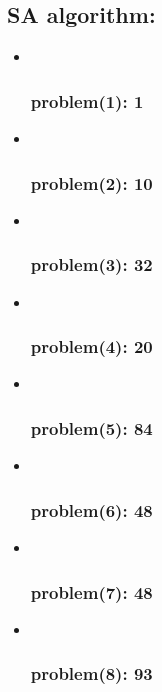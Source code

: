 \documentclass[11pt]{article}
\begin{document}
\hypertarget{sa-algorithm}{%
\subsection{\texorpdfstring{ SA
algorithm:}{  SA algorithm:}}\label{sa-algorithm}}

\begin{itemize}
\item ~
  \hypertarget{problem1-1}{%
  \subsubsection{\texorpdfstring{ problem(1):
  1}{  problem(1): 1}}\label{problem1-1}}
\item ~
  \hypertarget{problem2-10}{%
  \subsubsection{\texorpdfstring{ problem(2):
  10}{  problem(2): 10}}\label{problem2-10}}
\item ~
  \hypertarget{problem3-32}{%
  \subsubsection{\texorpdfstring{ problem(3):
  32}{  problem(3): 32}}\label{problem3-32}}
\item ~
  \hypertarget{problem4-20}{%
  \subsubsection{\texorpdfstring{ problem(4):
  20}{  problem(4): 20}}\label{problem4-20}}
\item ~
  \hypertarget{problem5-84}{%
  \subsubsection{\texorpdfstring{ problem(5):
  84}{  problem(5): 84}}\label{problem5-84}}
\item ~
  \hypertarget{problem6-48}{%
  \subsubsection{\texorpdfstring{ problem(6):
  48}{  problem(6): 48}}\label{problem6-48}}
\item ~
  \hypertarget{problem7-48}{%
  \subsubsection{\texorpdfstring{ problem(7):
  48}{  problem(7): 48}}\label{problem7-48}}
\item ~
  \hypertarget{problem8-93}{%
  \subsubsection{\texorpdfstring{ problem(8):
  93}{  problem(8): 93}}\label{problem8-93}}
\end{itemize}
\end{document}
